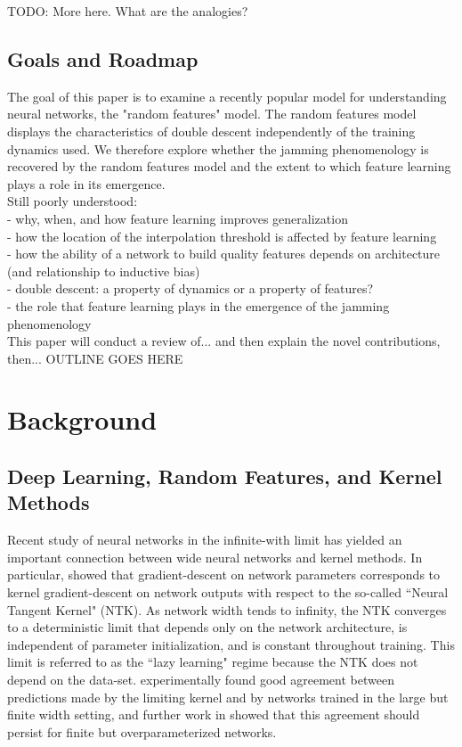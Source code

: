 \documentclass[a4paper, 12pt]{article}
\begin{document}
TODO: More here. What are the analogies? 

\subsection{Goals and Roadmap}

The goal of this paper is to examine a recently popular model for understanding neural networks, the "random features" model. The random features model displays the characteristics of double descent independently of the training dynamics used. We therefore explore whether the jamming phenomenology is recovered by the random features model and the extent to which feature learning plays a role in its emergence.\\


Still poorly understood:\\
- why, when, and how feature learning improves generalization\\
- how the location of the interpolation threshold is affected by feature learning\\
- how the ability of a network to build quality features depends on architecture (and relationship to inductive bias) \\
- double descent: a property of dynamics or a property of features?\\
- the role that feature learning plays in the emergence of the jamming phenomenology\\

This paper will conduct a review of... and then explain the novel contributions, then... OUTLINE GOES HERE

\section{Background}
\subsection{Deep Learning, Random Features, and Kernel Methods}

Recent study of neural networks in the infinite-with limit has yielded an important connection between wide neural networks and kernel methods. In particular, \cite{jacotNeuralTangentKernel2018} showed that gradient-descent on network parameters corresponds to kernel gradient-descent on network outputs with respect to the so-called ``Neural Tangent Kernel" (NTK). As network width tends to infinity, the NTK converges to a deterministic limit that depends only on the network architecture, is independent of parameter initialization, and is constant throughout training. This limit is referred to as the ``lazy learning" regime because the NTK does not depend on the data-set. \cite{jacotNeuralTangentKernel2018} experimentally found good agreement between predictions made by the limiting kernel and by networks trained in the large but finite width setting, and further work in \cite{allen-zhuConvergenceTheoryDeep2019} showed that this agreement should persist for finite but overparameterized networks.
\end{document}
